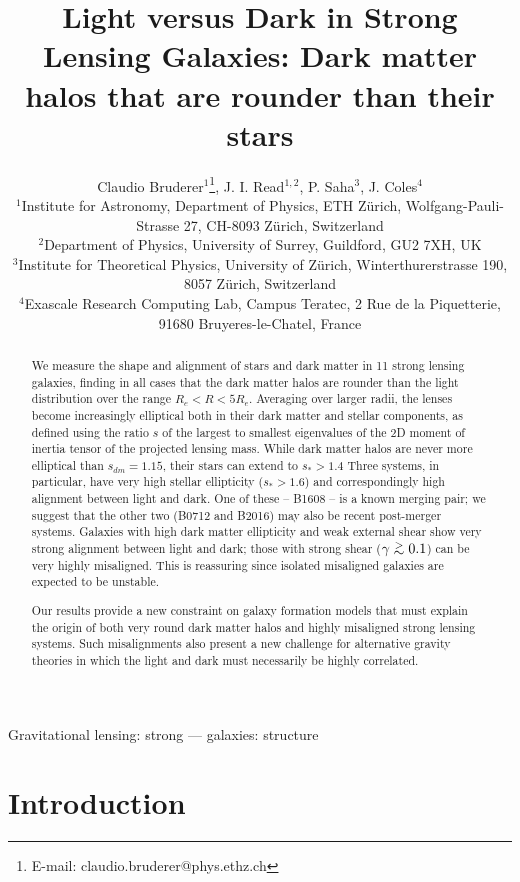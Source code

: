 \documentclass[useAMS,usenatbib]{mn2e}
\title[Light versus Dark in Strong Lensing Galaxies]{Light versus Dark in Strong Lensing Galaxies: Dark matter halos that are rounder than their stars}
\author[Bruderer]{Claudio Bruderer$^{1}$\thanks{E-mail: claudio.bruderer@phys.ethz.ch}, J. I. Read$^{1,2}$, P. Saha$^{3}$, J. Coles$^{4}$\\
$^{1}$Institute for Astronomy, Department of Physics, ETH Z\"urich, Wolfgang-Pauli-Strasse 27, CH-8093 Z\"urich, Switzerland\\
$^{2}$Department of Physics, University of Surrey, Guildford, GU2 7XH, UK\\
$^{3}$Institute for Theoretical Physics, University of Z\"urich, Winterthurerstrasse 190, 8057 Z\"urich, Switzerland\\
$^{4}$Exascale Research Computing Lab, Campus Teratec, 2 Rue de la Piquetterie, 91680 Bruyeres-le-Chatel, France
}
\def\gtsima{$\; \buildrel > \over \sim \;$}
\def\simgt{\lower.5ex\hbox{\gtsima}}
\begin{document}
\maketitle

\begin{abstract}
We measure the shape and alignment of stars and dark matter in 11 strong
lensing galaxies, finding in all cases that the dark matter halos are rounder
than the light distribution over the range $R_e < R < 5R_e$.  Averaging over
larger radii, the lenses become increasingly elliptical both in their dark
matter and stellar components, as defined using the ratio $s$ of the largest to
smallest eigenvalues of the 2D moment of inertia tensor of the projected
lensing mass.  While dark matter halos are never more elliptical than $s_{dm} =
1.15$, their stars can extend to $s_* > 1.4$ Three systems, in particular, have
very high stellar ellipticity ($s_* > 1.6$) and correspondingly high alignment
between light and dark. One of these -- B1608 -- is a known merging pair; we
suggest that the other two (B0712 and B2016) may also be recent post-merger
systems.  Galaxies with high dark matter ellipticity and weak external shear
show very strong alignment between light and dark; those with strong shear
($\gamma \simgt 0.1$) can be very highly misaligned. This is reassuring since
isolated misaligned galaxies are expected to be unstable. 

Our results provide a new constraint on galaxy formation models that must
explain the origin of both very round dark matter halos and highly misaligned
strong lensing systems. Such misalignments also present a new challenge for alternative
gravity theories in which the light and dark must necessarily be highly
correlated.

\end{abstract}

\begin{keywords}
Gravitational lensing: strong --- galaxies: structure
\end{keywords}


\section{Introduction}\label{sec:introduction}
\end{document}
